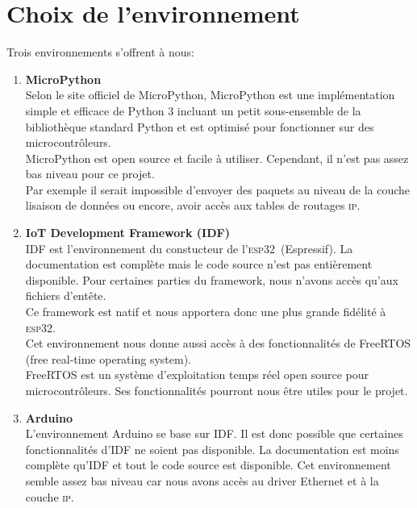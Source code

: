 \documentclass[a4paper, 12pt]{report}
\newcommand{\esp}{\textsc{esp32}}
\begin{document}
\section{Choix de l'environnement}
    Trois environnements s'offrent à nous:
    \begin{enumerate}
        \item \textbf{MicroPython}\\
            Selon le site officiel de MicroPython\cite{micropython_w}, MicroPython est une implémentation simple et efficace de Python 3
            incluant un petit sous-ensemble de la bibliothèque standard Python et est optimisé pour fonctionner sur des microcontrôleurs.\\
            MicroPython est open source et facile à utiliser. Cependant, il n'est pas assez bas niveau pour ce projet.\\
            Par exemple il serait impossible d'envoyer des paquets au niveau de la couche lisaison de données ou encore, avoir accès aux tables de routages \textsc{ip}.\\
        
        \item \textbf{IoT Development Framework (IDF)}\\
            IDF est l'environnement du constucteur de l'\esp\ (Espressif). La documentation est complète mais le code source n'est pas entièrement disponible. Pour certaines
            parties du framework, nous n'avons accès qu'aux fichiers d'entête.\\
            Ce framework est natif et nous apportera donc une plus grande fidélité à \esp. \\
            Cet environnement nous donne aussi accès à des fonctionnalités de FreeRTOS (free real-time operating system).\\
            FreeRTOS est un système d'exploitation temps réel open source pour microcontrôleurs. Ses fonctionnalités pourront nous être utiles pour le projet.\\

        \item \textbf{Arduino}\\
            L'environnement Arduino se base sur IDF. Il est donc possible que certaines fonctionnalités d'IDF ne soient pas disponible. La documentation est moins complète qu'IDF et tout le code source est disponible. Cet environnement semble assez bas
            niveau car nous avons accès au driver Ethernet et à la couche \textsc{ip}.
    \end{enumerate}
\end{document}

